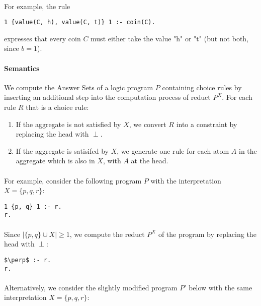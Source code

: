 \documentclass{article}
\theoremstyle{plain}
\theoremstyle{definition}
\begin{document}
\begin{multicols}{2}
\paragraph{} For example, the rule 

\begin{lstlisting}
1 {value(C, h), value(C, t)} 1 :- coin(C).
\end{lstlisting}

expresses that every coin $C$ must either take the value "h" or "t" (but not both, since $b = 1$).

\paragraph{Semantics} We compute the Answer Sets of a logic program $P$ containing choice rules by inserting an additional step into the computation process of reduct $P^X$. For each rule $R$ that is a choice rule:

\begin{enumerate}
\item If the aggregate is not satisfied by $X$, we convert $R$ into a constraint by replacing the head with $\perp$.
\item If the aggregate is satisifed by $X$, we generate one rule for each atom $A$ in the aggregate which is also in $X$, with $A$ at the head.
\end{enumerate}

\paragraph{} For example, consider the following program $P$ with the interpretation $X = \{p, q, r\}$:

\begin{lstlisting}
1 {p, q} 1 :- r.
r.
\end{lstlisting}

\paragraph{} Since $| \{ p, q \} \cup X | \geq 1$, we compute the reduct $P^X$ of the program by replacing the head with $\perp$:

\begin{lstlisting}[mathescape=true]
$\perp$ :- r.
r.
\end{lstlisting}

\paragraph{} Alternatively, we consider the slightly modified program $P'$ below with the same interpretation $X = \{p, q, r\}$:


\end{multicols}
\end{document}
